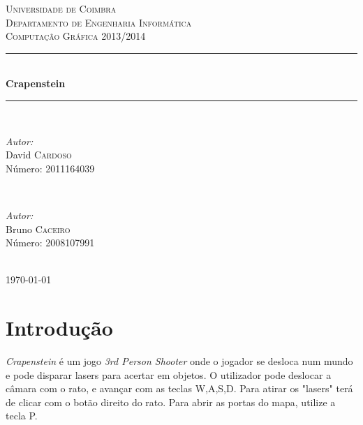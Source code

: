 \documentclass[12pt]{article}
\begin{document}
\renewcommand*\contentsname{Índice}

\begin{titlepage}

\newcommand{\HRule}{\rule{\linewidth}{0.5mm}} 
\center 
 

\textsc{\LARGE Universidade de Coimbra}\\[1.5cm] %
\textsc{\Large Departamento de Engenharia Informática}\\[4cm] %
\textsc{\large Computação Gráfica 2013/2014}\\[1cm] %


\HRule \\[0.5cm]
{ \huge \bfseries Crapenstein}\\[0.4cm] 
\HRule \\[8cm]
 
\begin{minipage}{0.4\textwidth}
\begin{flushleft} \large
\emph{Autor:}\\
David \textsc{Cardoso}  \\Número: 2011164039
\end{flushleft}
\end{minipage}
~
\begin{minipage}{0.4\textwidth}

\begin{flushright} \large
\emph{Autor:} \\
Bruno \textsc{Caceiro}  \\Número: 2008107991
\end{flushright}
\end{minipage}\\[2cm]

{\large \today}\\[3cm]

\vfill

\end{titlepage}





\section{Introdução}
\emph{Crapenstein} é um jogo \emph{3rd Person Shooter} onde o jogador se desloca num mundo e pode disparar lasers para acertar em objetos. O utilizador pode deslocar a câmara com o rato, e avançar com as teclas W,A,S,D. Para atirar os "lasers" terá de clicar com o botão direito do rato. Para abrir as portas do mapa, utilize a tecla P.
\end{document}

